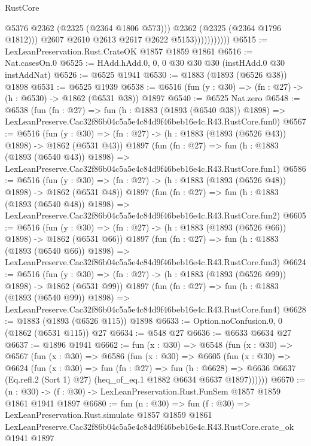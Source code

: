 \begin{lexlean}{RustCore}
\begin{coremodule}
                              @5376
                              @2362
                              (@2325 (@2364 @1806 @573)))
                            @2362
                            (@2325 (@2364 @1796 @1812)))
                          @2607
                          @2610
                          @2613
                          @2617
                          @2622
                          @5153)))))))))))
@6515 := LexLeanPreservation.Rust.CrateOK @1857 @1859 @1861
@6516 := Nat.casesOn.{0}
@6525 := HAdd.hAdd.{0, 0, 0} @30 @30 @30 (instHAdd.{0} @30 instAddNat)
@6526 := @6525 @1941
@6530 := @1883 (@1893 (@6526 @38)) @1898
@6531 := @6525 @1939
@6538 := @6516 (fun (y : @30) => (fn : @27) -> (h : @6530) -> @1862 (@6531 @38)) @1897
@6540 := @6525 Nat.zero
@6548 := @6538
    (fun (fn : @27) =>
    fun (h : @1883 (@1893 (@6540 @38)) @1898) =>
    LexLeanPreserve.Cac32f86b04c5a5e4c84d9f46beb16e4c.R43.RustCore.fun0)
@6567 := @6516
    (fun (y : @30) => (fn : @27) -> (h : @1883 (@1893 (@6526 @43)) @1898) -> @1862 (@6531 @43))
    @1897
    (fun (fn : @27) =>
    fun (h : @1883 (@1893 (@6540 @43)) @1898) =>
    LexLeanPreserve.Cac32f86b04c5a5e4c84d9f46beb16e4c.R43.RustCore.fun1)
@6586 := @6516
    (fun (y : @30) => (fn : @27) -> (h : @1883 (@1893 (@6526 @48)) @1898) -> @1862 (@6531 @48))
    @1897
    (fun (fn : @27) =>
    fun (h : @1883 (@1893 (@6540 @48)) @1898) =>
    LexLeanPreserve.Cac32f86b04c5a5e4c84d9f46beb16e4c.R43.RustCore.fun2)
@6605 := @6516
    (fun (y : @30) => (fn : @27) -> (h : @1883 (@1893 (@6526 @66)) @1898) -> @1862 (@6531 @66))
    @1897
    (fun (fn : @27) =>
    fun (h : @1883 (@1893 (@6540 @66)) @1898) =>
    LexLeanPreserve.Cac32f86b04c5a5e4c84d9f46beb16e4c.R43.RustCore.fun3)
@6624 := @6516
    (fun (y : @30) => (fn : @27) -> (h : @1883 (@1893 (@6526 @99)) @1898) -> @1862 (@6531 @99))
    @1897
    (fun (fn : @27) =>
    fun (h : @1883 (@1893 (@6540 @99)) @1898) =>
    LexLeanPreserve.Cac32f86b04c5a5e4c84d9f46beb16e4c.R43.RustCore.fun4)
@6628 := @1883 (@1893 (@6526 @115)) @1898
@6633 := Option.noConfusion.{0, 0} (@1862 (@6531 @115)) @27
@6634 := @548 @27
@6636 := @6633 @6634 @27
@6637 := @1896 @1941
@6662 := fun (x : @30) =>
  @6548
    (fun (x : @30) =>
    @6567
      (fun (x : @30) =>
      @6586
        (fun (x : @30) =>
        @6605
          (fun (x : @30) =>
          @6624
            (fun (x : @30) =>
            fun (fn : @27) =>
            fun (h : @6628) =>
            @6636 @6637 (Eq.refl.{2} (Sort 1) @27) (heq_of_eq.{1} @1882 @6634 @6637 @1897))))))
@6670 := (n : @30) -> (f : @30) -> LexLeanPreservation.Rust.FunSem @1857 @1859 @1861 @1941 @1897
@6680 := fun (n : @30) =>
  fun (f : @30) =>
  LexLeanPreservation.Rust.simulate
    @1857
    @1859
    @1861
    LexLeanPreserve.Cac32f86b04c5a5e4c84d9f46beb16e4c.R43.RustCore.crate_ok
    @1941
    @1897
\end{coremodule}
\end{lexlean}
